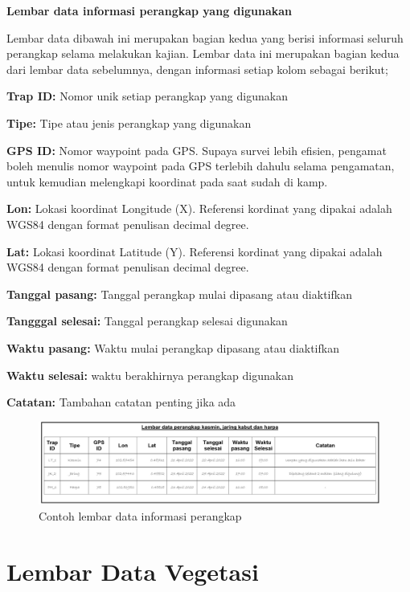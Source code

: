 \documentclass[
  oneside]{book}
\begin{document}
\textbf{Lembar data informasi perangkap yang digunakan}

Lembar data dibawah ini merupakan bagian kedua yang berisi informasi seluruh perangkap selama melakukan kajian. Lembar data ini merupakan bagian kedua dari lembar data sebelumnya, dengan informasi setiap kolom sebagai berikut;

\textbf{Trap ID:} Nomor unik setiap perangkap yang digunakan

\textbf{Tipe:} Tipe atau jenis perangkap yang digunakan

\textbf{GPS ID:} Nomor waypoint pada GPS. Supaya survei lebih efisien, pengamat boleh menulis nomor waypoint pada GPS terlebih dahulu selama pengamatan, untuk kemudian melengkapi koordinat pada saat sudah di kamp.

\textbf{Lon:} Lokasi koordinat Longitude (X). Referensi kordinat yang dipakai adalah WGS84 dengan format penulisan decimal degree.

\textbf{Lat:} Lokasi koordinat Latitude (Y). Referensi kordinat yang dipakai adalah WGS84 dengan format penulisan decimal degree.

\textbf{Tanggal pasang:} Tanggal perangkap mulai dipasang atau diaktifkan

\textbf{Tangggal selesai:} Tanggal perangkap selesai digunakan

\textbf{Waktu pasang:} Waktu mulai perangkap dipasang atau diaktifkan

\textbf{Waktu selesai:} waktu berakhirnya perangkap digunakan

\textbf{Catatan:} Tambahan catatan penting jika ada

\begin{figure}

{\centering \includegraphics[width=1\linewidth]{images/ldm_p} 

}

\caption{Contoh lembar data informasi perangkap}\label{fig:ldmp}
\end{figure}

\hypertarget{lembar-data-vegetasi}{%
\section*{Lembar Data Vegetasi}\label{lembar-data-vegetasi}}
\end{document}
